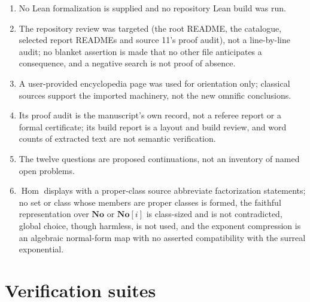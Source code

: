 \documentclass[11pt,oneside]{article}
\numberwithin{equation}{section}
\theoremstyle{definition}
\theoremstyle{remark}
\newcommand{\No}{\mathbf{No}}
\newcommand{\SC}{\No[i]}
\newcommand{\Hom}{\operatorname{Hom}}
\begin{document}
\begin{enumerate}[leftmargin=*,widest=00,label=12.\arabic*]
rational substitutions in them do not assume $1/2\in A$.
\item No Lean formalization is supplied and no repository Lean build was run.
\item The repository review was targeted (the root README, the catalogue,
selected report READMEs and source 11's proof audit), not a line-by-line audit;
no blanket assertion is made that no other file anticipates a consequence, and a
negative search is not proof of absence.
\item A user-provided encyclopedia page was used for orientation only;
classical sources support the imported machinery, not the new omnific
conclusions.
\item Its proof audit is the manuscript's own record, not a referee report or a
formal certificate; its build report is a layout and build review, and word
counts of extracted text are not semantic verification.
\item The twelve questions are proposed continuations, not an inventory of
named open problems.
\item $\Hom$ displays with a proper-class source abbreviate factorization
statements; no set or class whose members are proper classes is formed, the
faithful representation over $\No$ or $\SC$ is class-sized and is not
contradicted, global choice, though harmless, is not used, and the exponent
compression is an algebraic normal-form map with no asserted compatibility with
the surreal exponential.
\end{enumerate}

\section{Verification suites}\label{ogl:app:verification}
\end{document}
